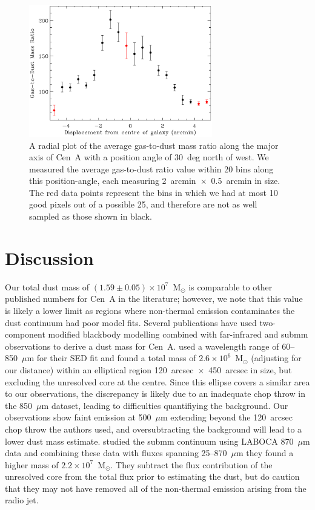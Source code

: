 \documentclass[useAMS,usenatbib,usegraphicx]{mn2e}
\begin{document}
\begin{figure}
\includegraphics[width=8cm]{Fig8_CenA_G2D_radial_plot}
\caption{A radial plot of the average gas-to-dust mass ratio along the major axis of Cen~A with a position angle of 30~deg north of west.  We measured the average gas-to-dust ratio value within 20 bins along this position-angle, each measuring 2~arcmin~$\times$~0.5~arcmin in size.  The red data points represent the bins in which we had at most 10 good pixels out of a possible 25, and therefore are not as well sampled as those shown in black.}
\label{fig:g2d_radial}
\end{figure}


\section{Discussion}\label{sec:discuss}
Our total dust mass of $(1.59 \pm 0.05) \times 10^{7}$~M$_{\odot}$ is comparable to other published numbers for Cen~A in the literature; however, we note that this value is likely a lower limit as regions where non-thermal emission contaminates the dust continuum had poor model fits.  Several publications have used two-component modified blackbody modelling combined with far-infrared and submm observations to derive a dust mass for Cen~A.  \citet{2002ApJ...565..131L} used a wavelength range of 60--850~$\mu$m for their SED fit and found a total mass of $2.6 \times 10^{6}$~M$_{\odot}$ (adjusting for our distance) within an elliptical region 120~arcsec~$\times$~450~arcsec in size, but excluding the unresolved core at the centre.  Since this ellipse covers a similar area to our observations, the discrepancy is likely due to an inadequate chop throw in the \citet{2002ApJ...565..131L} 850~$\mu$m dataset, leading to difficulties quantifiying the background.  Our observations show faint emission at 500~$\mu$m extending beyond the 120~arcsec chop throw the authors used, and oversubtracting the background will lead to a lower dust mass estimate.  \citet{2008A&A...490...77W} studied the submm continuum using LABOCA 870~$\mu$m data and combining these data with fluxes spanning 25--870~$\mu$m they found a higher mass of $2.2 \times 10^{7}$~M$_{\odot}$.  They subtract the flux contribution of the unresolved core from the total flux prior to estimating the dust, but do caution that they may not have removed all of the non-thermal emission arising from the radio jet.
\end{document}
